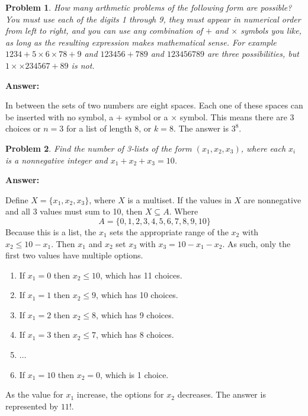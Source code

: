 \documentclass{article}
\theoremstyle{plain}
\newtheorem{problem}{Problem}
\begin{document}
\setcounter{problem}{13}
\begin{problem} %
How many arthmetic problems of the following form are possible? You must use each of the digits 1 through 9, they must appear in numerical order from left to right, and you can use any combination of $+$ and $\times$ symbols you like, as long as the resulting expression makes mathematical sense. For example $1234 + 5 \times 6 \times 78 + 9$ and $123456 + 789$ and $123456789$ are three possibilities, but $1 \times \times 234567 + 89$ is not.
\end{problem}

\textbf{Answer:}\smallskip

In between the sets of two numbers are eight spaces. Each one of these spaces can be inserted with no symbol, a $+$ symbol or a $\times$ symbol. This means there are 3 choices or $n=3$ for a list of length 8, or $k=8$. The answer is $3^8$.


\setcounter{problem}{16}
\begin{problem} %
Find the number of 3-lists of the form $(x_1, x_2, x_3)$, where each $x_i$ is a nonnegative integer and $x_1 + x_2 + x_3 = 10$.
\end{problem}

\textbf{Answer:}\smallskip

Define $X = \{x_1, x_2, x_3\}$, where $X$ is a multiset. If the values in $X$ are nonnegative and all 3 values must sum to 10, then $X \subseteq A$. Where
\begin{equation*}
    A = \{0, 1, 2, 3, 4, 5, 6, 7, 8, 9, 10\}
\end{equation*}
Because this is a list, the $x_1$ sets the appropriate range of the $x_2$ with $x_2 \le 10 - x_1$. Then $x_1$ and $x_2$ set $x_3$ with $x_3 = 10 - x_1 - x_2$. As such, only the first two values have multiple options.
\begin{enumerate}
    \item If $x_1 = 0$ then $x_2 \le 10$, which has 11 choices.
    \item If $x_1 = 1$ then $x_2 \le 9$, which has 10 choices.
    \item If $x_1 = 2$ then $x_2 \le 8$, which has 9 choices.
    \item If $x_1 = 3$ then $x_2 \le 7$, which has 8 choices.
    \item $\dots$
    \item If $x_1 = 10$ then $x_2 = 0$, which is 1 choice.
\end{enumerate}
As the value for $x_1$ increase, the options for $x_2$ decreases. The answer is represented by $11!$.
\end{document}
